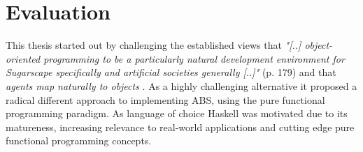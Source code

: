 \chapter{Evaluation}
\label{ch:evaluation}
This thesis started out by challenging the established views that \textit{"[..] object-oriented programming to be a particularly natural development environment for Sugarscape specifically and artificial societies generally [..]"} \cite{epstein_growing_1996} (p. 179) and that \textit{agents map naturally to objects} \cite{north_managing_2007}. As a highly challenging alternative it proposed a radical different approach to implementing ABS, using the pure functional programming paradigm. As language of choice Haskell was motivated due to its matureness, increasing relevance to real-world applications and cutting edge pure functional programming concepts. 

